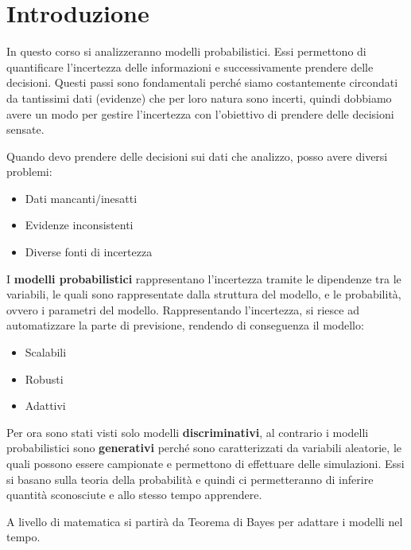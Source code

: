\chapter{Introduzione}
In questo corso si analizzeranno modelli probabilistici. Essi permettono
di quantificare l'incertezza delle informazioni e successivamente prendere delle
decisioni. Questi passi sono fondamentali perché siamo costantemente circondati
da tantissimi dati (evidenze) che per loro natura sono incerti, quindi dobbiamo
avere un modo per gestire l'incertezza con l'obiettivo di prendere delle
decisioni sensate.

Quando devo prendere delle decisioni sui dati che analizzo, posso avere diversi
problemi:
\begin{itemize}
    \item Dati mancanti/inesatti
    \item Evidenze inconsistenti
    \item Diverse fonti di incertezza
\end{itemize}
I \textbf{modelli probabilistici} rappresentano l'incertezza tramite le
dipendenze tra le variabili, le quali sono rappresentate dalla struttura del
modello, e le probabilità, ovvero i parametri del modello. Rappresentando
l'incertezza, si riesce ad automatizzare la parte di previsione, rendendo di
conseguenza il modello:
\begin{itemize}
    \item Scalabili
    \item Robusti
    \item Adattivi
\end{itemize}

Per ora sono stati visti solo modelli \textbf{discriminativi}, al contrario i
modelli probabilistici sono \textbf{generativi} perché sono caratterizzati da
variabili aleatorie, le quali possono essere campionate e permettono di
effettuare delle simulazioni. Essi si basano sulla teoria della probabilità e
quindi ci permetteranno di inferire quantità sconosciute e allo stesso tempo
apprendere.

A livello di matematica si partirà da Teorema di Bayes per adattare i modelli
nel tempo.

